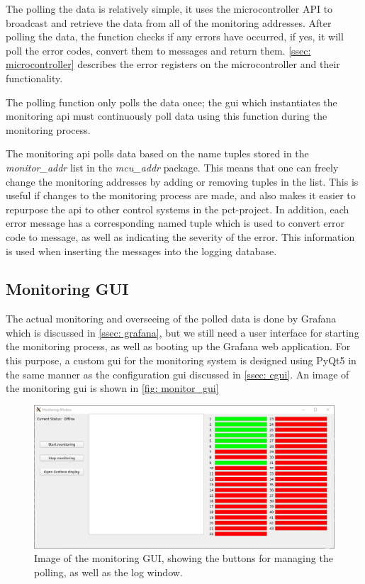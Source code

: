\documentclass[main.tex]{subfiles}
\begin{document}
The polling the data is relatively simple, it uses the microcontroller API to broadcast and retrieve the data from all of the monitoring addresses. After polling the data, the function checks if any errors have occurred, if yes, it will poll the error codes, convert them to messages and return them. \autoref{ssec: microcontroller} describes the error registers on the microcontroller and their functionality.

The polling function only polls the data once; the \gls{gui} which instantiates the monitoring \gls{api} must continuously poll data using this function during the monitoring process.

The monitoring \gls{api} polls data based on the name tuples stored in the \textit{monitor\_addr} list in the \textit{mcu\_addr} package. This means that one can freely change the monitoring addresses by adding or removing tuples in the list. This is useful if changes to the monitoring process are made, and also makes it easier to repurpose the \gls{api} to other control systems in the \gls{pct}-project. In addition, each error message has a corresponding named tuple which is used to convert error code to message, as well as indicating the severity of the error. This information is used when inserting the messages into the logging database.


\subsection{Monitoring GUI}

The actual monitoring and overseeing of the polled data is done by Grafana which is discussed in \autoref{ssec: grafana}, but we still need a user interface for starting the monitoring process, as well as booting up the Grafana web application. For this purpose, a custom \gls{gui} for the monitoring system is designed using PyQt5 in the same manner as the configuration \gls{gui} discussed in \autoref{ssec: cgui}. An image of the monitoring \gls{gui} is shown in \autoref{fig: monitor_gui}

\begin{figure}[!ht]
    \centering
    \includegraphics[scale=0.6]{images/monitoring_gui.png}
    \caption{Image of the monitoring GUI, showing the buttons for managing the polling, as well as the log window.}
    \label{fig: monitor_gui}
\end{figure}
\FloatBarrier
\end{document}
